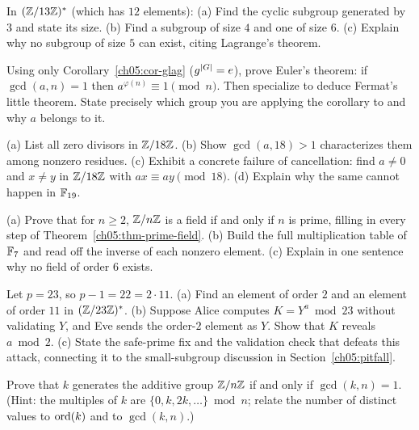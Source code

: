 \begin{exercise}
\label{ch05:ex-subgroups}
In $(\mathbb{Z}/13\mathbb{Z})^{*}$ (which has $12$ elements): (a) Find the cyclic subgroup generated by $3$ and
state its size. (b) Find a subgroup of size $4$ and one of size $6$. (c) Explain why no
subgroup of size $5$ can exist, citing Lagrange's theorem.
\end{exercise}

\begin{exercise}
\label{ch05:ex-euler-proof}
Using only Corollary~\ref{ch05:cor-glag} ($g^{\lvert G\rvert} = e$), prove Euler's theorem:
if $\gcd(a,n)=1$ then $a^{\varphi(n)} \equiv 1 \pmod n$. Then specialize to deduce Fermat's
little theorem. State precisely which group you are applying the corollary to and why $a$
belongs to it.
\end{exercise}

\begin{exercise}
\label{ch05:ex-zerodiv}
(a) List all zero divisors in $\mathbb{Z}/18\mathbb{Z}$. (b) Show $\gcd(a,18) > 1$ characterizes
them among nonzero residues. (c) Exhibit a concrete failure of cancellation: find $a \ne 0$ and $x \ne y$ in
$\mathbb{Z}/18\mathbb{Z}$ with $a x \equiv a y \pmod{18}$. (d) Explain why the same cannot happen in $\mathbb{F}_{19}$.
\end{exercise}

\begin{exercise}
\label{ch05:ex-fields}
(a) Prove that for $n \ge 2$, $\mathbb{Z}/n\mathbb{Z}$ is a field if and only if $n$ is prime, filling in every step of
Theorem~\ref{ch05:thm-prime-field}. (b) Build the full multiplication table of $\mathbb{F}_7$ and
read off the inverse of each nonzero element. (c) Explain in one sentence why no field of
order $6$ exists.
\end{exercise}

\begin{exercise}
\label{ch05:ex-small-subgroup}
Let $p = 23$, so $p - 1 = 22 = 2 \cdot 11$. (a) Find an element of order $2$ and an
element of order $11$ in $(\mathbb{Z}/23\mathbb{Z})^{*}$. (b) Suppose Alice computes $K = Y^a \bmod 23$ without
validating $Y$, and Eve sends the order-$2$ element as $Y$. Show that $K$ reveals
$a \bmod 2$. (c) State the safe-prime fix and the validation check that defeats this
attack, connecting it to the small-subgroup discussion in
Section~\ref{ch05:pitfall}.
\end{exercise}

\begin{exercise}
\label{ch05:ex-additive-gen}
Prove that $k$ generates the additive group $\mathbb{Z}/n\mathbb{Z}$ if and only if $\gcd(k,n)=1$. (Hint:
the multiples of $k$ are $\{0, k, 2k, \dots\} \bmod n$; relate the number of distinct
values to $\operatorname{ord}(k)$ and to $\gcd(k,n)$.)
\end{exercise}

